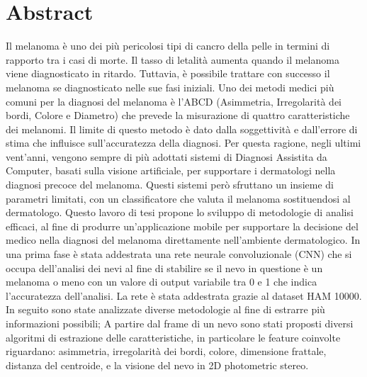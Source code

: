 \chapter*{Abstract}



\lhead{\bfseries }
\rhead{\thepage}


Il melanoma è uno dei più pericolosi tipi di cancro della pelle in termini di rapporto tra i casi di morte.
\newline
Il tasso di letalità aumenta quando il melanoma viene diagnosticato in ritardo. 
Tuttavia, è possibile trattare con successo il melanoma se diagnosticato nelle sue fasi iniziali.
\newline
Uno dei metodi medici più comuni per la diagnosi del melanoma è l'ABCD (Asimmetria, Irregolarità dei bordi, Colore e Diametro) che prevede la misurazione di quattro caratteristiche dei melanomi.
\newline
Il limite di questo metodo è dato dalla soggettività e dall'errore di stima che influisce sull'accuratezza della diagnosi.
\newline
Per questa ragione, negli ultimi vent'anni, vengono sempre di più adottati sistemi di Diagnosi Assistita da Computer, basati sulla visione artificiale, per supportare i dermatologi nella diagnosi precoce del melanoma.
Questi sistemi però sfruttano un insieme di parametri limitati, con un classificatore che valuta il melanoma sostituendosi al dermatologo.
\newline
Questo lavoro di tesi propone lo sviluppo di metodologie di analisi efficaci, al fine di produrre un'applicazione mobile per supportare la decisione del medico nella diagnosi del melanoma direttamente nell'ambiente dermatologico.
\newline
In una prima fase è stata addestrata una rete neurale convoluzionale (CNN) che si occupa dell'analisi dei nevi al fine di stabilire se il nevo in questione è un melanoma o meno con un valore di output variabile tra 0 e 1 che indica l'accuratezza dell'analisi.
La rete è stata addestrata grazie al dataset HAM 10000.
\newline
In seguito sono state analizzate diverse metodologie al fine di estrarre più informazioni possibili;
A partire dal frame di un nevo sono stati proposti diversi algoritmi di estrazione delle caratteristiche, in particolare le feature coinvolte riguardano: asimmetria, irregolarità dei bordi, colore, dimensione frattale, distanza del centroide, e la visione del nevo in 2D photometric stereo.
\newline
